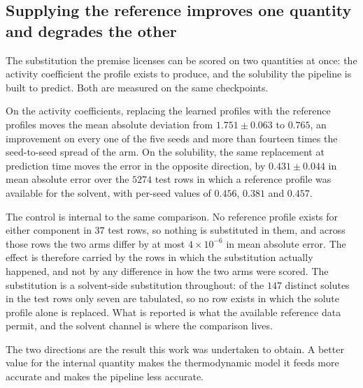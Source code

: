 \subsection{Supplying the reference improves one quantity and degrades the other}
\label{sec:twosided}

The substitution the premise licenses can be scored on two quantities at once: the activity
coefficient the profile exists to produce, and the solubility the pipeline is built to predict.
Both are measured on the same checkpoints.

On the activity coefficients, replacing the learned profiles with the reference profiles moves the
mean absolute deviation from $1.751\pm0.063$ to $0.765$, an improvement on every one of the five
seeds and more than fourteen times the seed-to-seed spread of the arm. On the solubility, the same
replacement at prediction time moves the error in the opposite direction, by
$0.431\pm0.044$ in mean absolute error over the $5274$ test rows in which a reference profile was
available for the solvent, with per-seed values of $0.456$, $0.381$ and $0.457$.

The control is internal to the same comparison. No reference profile exists for either component in $37$ test
rows, so nothing is substituted in them, and across those rows the two arms differ by at most
$4\times10^{-6}$ in mean absolute error. The effect is therefore carried by the rows in
which the substitution actually happened, and not by any difference in how the two arms were
scored. The substitution is a solvent-side substitution throughout: of the $147$ distinct solutes
in the test rows only seven are tabulated, so no row exists in which the solute profile alone is
replaced. What is reported is what the available reference data permit, and the solvent channel is
where the comparison lives.

The two directions are the result this work was undertaken to obtain. A better value for the
internal quantity makes the thermodynamic model it feeds more accurate and makes the pipeline less
accurate.
